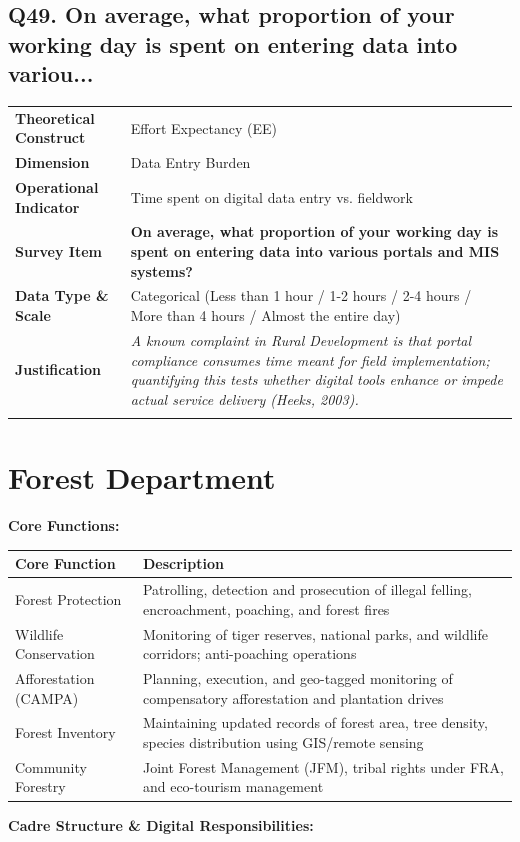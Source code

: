 \documentclass[11pt,a4paper]{article}
\makeatletter
\newcommand{\qcard}[8]{%
\noindent\begin{tabularx}{\textwidth}{@{}>{\columncolor{#7}\bfseries\small}L{3.2cm}|X@{}}
\arrayrulecolor{#8}\hline
Theoretical Construct & #1 \\
Dimension & #2 \\
Operational Indicator & #3 \\
\arrayrulecolor{gold}\hline
\rowcolor{white}\textbf{\color{#8}Survey Item} & \textbf{\color{#8}#4} \\
\arrayrulecolor{gold}\hline
Data Type \& Scale & #5 \\
Justification & \textit{#6} \\
\arrayrulecolor{#8}\hline
\end{tabularx}\vspace{10pt}
}
\makeatother
\begin{document}
\subsection*{Q49. On average, what proportion of your working day is spent on entering data into variou...}
\qcard{Effort Expectancy (EE)}{Data Entry Burden}{Time spent on digital data entry vs. fieldwork}{On average, what proportion of your working day is spent on entering data into various portals and MIS systems?}{Categorical (Less than 1 hour / 1-2 hours / 2-4 hours / More than 4 hours / Almost the entire day)}{A known complaint in Rural Development is that portal compliance consumes time meant for field implementation; quantifying this tests whether digital tools enhance or impede actual service delivery (Heeks, 2003).}{rdbg}{rdcol}


\section{\textcolor{forcol}{Forest Department}}

\textbf{Core Functions:}

\begin{table}[H]\centering\small
\begin{tabularx}{\textwidth}{L{3cm} X}
\toprule
\textbf{Core Function} & \textbf{Description} \\
\midrule
Forest Protection & Patrolling, detection and prosecution of illegal felling, encroachment, poaching, and forest fires \\[3pt]
Wildlife Conservation & Monitoring of tiger reserves, national parks, and wildlife corridors; anti-poaching operations \\[3pt]
Afforestation (CAMPA) & Planning, execution, and geo-tagged monitoring of compensatory afforestation and plantation drives \\[3pt]
Forest Inventory & Maintaining updated records of forest area, tree density, species distribution using GIS/remote sensing \\[3pt]
Community Forestry & Joint Forest Management (JFM), tribal rights under FRA, and eco-tourism management \\
\bottomrule
\end{tabularx}
\end{table}


\textbf{Cadre Structure \& Digital Responsibilities:}
\end{document}
